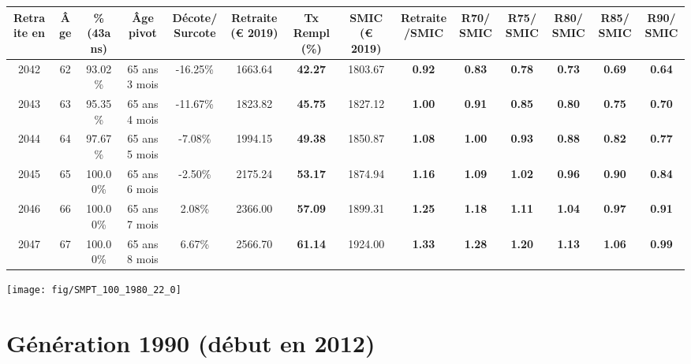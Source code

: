 \begin{adjustbox}{max width=\textwidth} 
\begin{tabular}[htb]{|c|c||c|c|c||c|c||c|c||c|c|c|c|c|} 
\hline 
 Retraite en &  Âge &  \%(43ans) &  Âge pivot &  Décote/Surcote &  Retraite (\euro{} 2019) &  Tx Rempl(\%) &  SMIC (\euro{} 2019) &  Retraite/SMIC &  R70/SMIC &  R75/SMIC &  R80/SMIC &  R85/SMIC &  R90/SMIC \\ 
\hline \hline 
 2042 &  62 &  93.02\% &  65 ans 3 mois &  -16.25\% &  1663.64 &  {\bf 42.27} &  1803.67 &  {\bf {\color{red} 0.92}} &  {\bf {\color{red} 0.83}} &  {\bf {\color{red} 0.78}} &  {\bf {\color{red} 0.73}} &  {\bf {\color{red} 0.69}} &  {\bf {\color{red} 0.64}} \\ 
\hline 
 2043 &  63 &  95.35\% &  65 ans 4 mois &  -11.67\% &  1823.82 &  {\bf 45.75} &  1827.12 &  {\bf {\color{red} 1.00}} &  {\bf {\color{red} 0.91}} &  {\bf {\color{red} 0.85}} &  {\bf {\color{red} 0.80}} &  {\bf {\color{red} 0.75}} &  {\bf {\color{red} 0.70}} \\ 
\hline 
 2044 &  64 &  97.67\% &  65 ans 5 mois &  -7.08\% &  1994.15 &  {\bf 49.38} &  1850.87 &  {\bf 1.08} &  {\bf {\color{red} 1.00}} &  {\bf {\color{red} 0.93}} &  {\bf {\color{red} 0.88}} &  {\bf {\color{red} 0.82}} &  {\bf {\color{red} 0.77}} \\ 
\hline 
 2045 &  65 &  100.00\% &  65 ans 6 mois &  -2.50\% &  2175.24 &  {\bf 53.17} &  1874.94 &  {\bf 1.16} &  {\bf 1.09} &  {\bf 1.02} &  {\bf {\color{red} 0.96}} &  {\bf {\color{red} 0.90}} &  {\bf {\color{red} 0.84}} \\ 
\hline 
 2046 &  66 &  100.00\% &  65 ans 7 mois &  2.08\% &  2366.00 &  {\bf 57.09} &  1899.31 &  {\bf 1.25} &  {\bf 1.18} &  {\bf 1.11} &  {\bf 1.04} &  {\bf {\color{red} 0.97}} &  {\bf {\color{red} 0.91}} \\ 
\hline 
 2047 &  67 &  100.00\% &  65 ans 8 mois &  6.67\% &  2566.70 &  {\bf 61.14} &  1924.00 &  {\bf 1.33} &  {\bf 1.28} &  {\bf 1.20} &  {\bf 1.13} &  {\bf 1.06} &  {\bf {\color{red} 0.99}} \\ 
\hline 
\hline 
\end{tabular} 
\end{adjustbox} 
 
 \vspace{0.1cm} 

 {\hspace{-2.2cm}\texttt{[image: fig/SMPT\_100\_1980\_22\_0]}} 

\newpage 
 
\section{Génération 1990 (début en 2012)\label{SMPT_100_1990_22_0}} 
 
